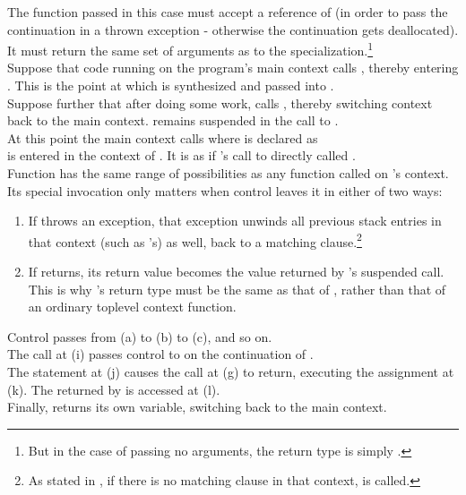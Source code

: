 The function passed in this case must accept a reference of \cont (in order to
pass the continuation in a thrown exception - otherwise the continuation gets
deallocated). It must return the same set of arguments as to the
\resume specialization.\footnote{But in the case of passing no arguments, the
return type is simply .}\\

Suppose that code running on the program's main context calls ,
thereby entering . This is the point at which  is synthesized
and passed into .\\
Suppose further that after doing some work,  calls ,
thereby switching context back to the main context.  remains suspended
in the call to .\\
At this point the main context calls 
where  is declared as\\
  is entered in the context of .
It is as if 's call to  directly called .\\
Function  has the same range of possibilities as any function called on
's context. Its special invocation only matters when control leaves it
in either of two ways:

\begin{enumerate}
  \item If  throws an exception, that exception unwinds all previous
        stack entries in that context (such as 's) as well, back to a
        matching  clause.\footnote{As stated in ,
        if there is no matching  clause in that context,
         is called.}
  \item If  returns, its return value becomes the value returned by
        's suspended  call. This is why 's
        return type must be the same as that of \resume, rather than that of an
        ordinary toplevel context function.
\end{enumerate}


Control passes from (a) to (b) to (c), and so on.\\
The  call at (i) passes control
to  on the continuation of .\\
The  statement at (j) causes the \resume call at (g) to return,
executing the assignment at (k). The  returned by  is
accessed at (l).\\
Finally,  returns its own  variable, switching back to the main
context.


